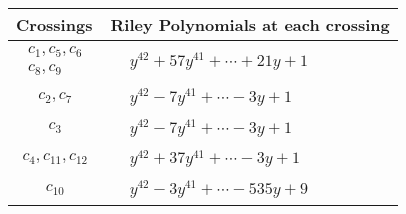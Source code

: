\documentclass[1p]{elsarticle_modified}
\theoremstyle{definition}
\begin{document}
\begin{tabular}{m{50pt}|m{274pt}}
Crossings & \hspace{64pt}Riley Polynomials at each crossing \\
\hline $$\begin{aligned}c_{1},c_{5},c_{6}\\c_{8},c_{9}\end{aligned}$$&$\begin{aligned}
&y^{42}+57 y^{41}+\cdots+21 y+1
\end{aligned}$\\
\hline $$\begin{aligned}c_{2},c_{7}\end{aligned}$$&$\begin{aligned}
&y^{42}-7 y^{41}+\cdots-3 y+1
\end{aligned}$\\
\hline $$\begin{aligned}c_{3}\end{aligned}$$&$\begin{aligned}
&y^{42}-7 y^{41}+\cdots-3 y+1
\end{aligned}$\\
\hline $$\begin{aligned}c_{4},c_{11},c_{12}\end{aligned}$$&$\begin{aligned}
&y^{42}+37 y^{41}+\cdots-3 y+1
\end{aligned}$\\
\hline $$\begin{aligned}c_{10}\end{aligned}$$&$\begin{aligned}
&y^{42}-3 y^{41}+\cdots-535 y+9
\end{aligned}$\\
\hline
\end{tabular}
\vskip 2pc
\end{document}
